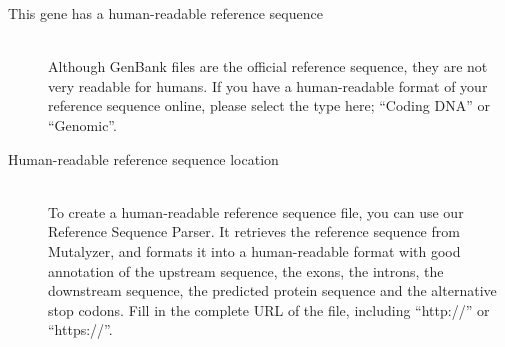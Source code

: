 \documentclass[a4paper,oneside,openany,12pt]{memoir}
\begin{document}
\begin{description}
  \item[This gene has a human-readable reference sequence] \hfill \\
  Although GenBank files are the official reference sequence, they are not very readable for humans.
  If you have a human-readable format of your reference sequence online, please select the type here; ``Coding DNA'' or ``Genomic''.
  \pagebreak[4] %
  \item[Human-readable reference sequence location] \hfill \\
  To create a human-readable reference sequence file, you can use our Reference Sequence Parser.
  It retrieves the reference sequence from Mutalyzer, and formats it into a human-readable
   format with good annotation of the upstream sequence, the exons, the introns, the downstream sequence,
   the predicted protein sequence and the alternative stop codons.
  Fill in the complete URL of the file, including ``http://'' or ``https://''.
\end{description}
\end{document}
